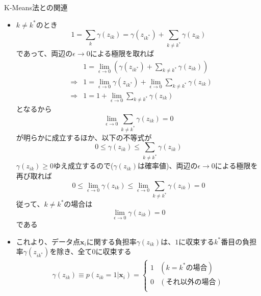 \documentclass[dvipdfmx,notheorems,t]{beamer}
\begin{document}
\begin{frame}{K-Means法との関連}
\begin{itemize}
\begin{itemize}
		\item $k \neq k^*$のとき
		\begin{equation}
			1 = \sum_k \gamma(z_{ik}) = \gamma(z_{ik^*}) + \sum_{k \neq k^*} \gamma(z_{ik})
		\end{equation}
		であって、両辺の$\epsilon \to 0$による極限を取れば
		\begin{eqnarray}
			&& 1 = \lim_{\epsilon \to 0} \left( \gamma(z_{ik^*}) + \sum_{k \neq k^*} \gamma(z_{ik}) \right) \nonumber \\
			&\Rightarrow& 1 = \lim_{\epsilon \to 0} \gamma(z_{ik^*}) + \lim_{\epsilon \to 0} \sum_{k \neq k^*} \gamma(z_{ik}) \nonumber \\
			&\Rightarrow& 1 = 1 + \lim_{\epsilon \to 0} \sum_{k \neq k^*} \gamma(z_{ik})
		\end{eqnarray}
		となるから
		\begin{equation}
			\lim_{\epsilon \to 0} \sum_{k \neq k^*} \gamma(z_{ik}) = 0
		\end{equation}
		が明らかに成立するほか、以下の不等式が
		\begin{equation}
			0 \le \gamma(z_{ik}) \le \sum_{k \neq k^*} \gamma(z_{ik})
		\end{equation}
		$\gamma(z_{ik}) \ge 0$ゆえ成立するので($\gamma(z_{ik})$は確率値)、両辺の$\epsilon \to 0$による極限を再び取れば
		\begin{equation}
			0 \le \lim_{\epsilon \to 0} \gamma(z_{ik}) \le \lim_{\epsilon \to 0} \sum_{k \neq k^*} \gamma(z_{ik}) = 0
		\end{equation}
		従って、$k \neq k^*$の場合は
		\begin{equation}
			\lim_{\epsilon \to 0} \gamma(z_{ik}) = 0
		\end{equation}
		である
		
		\item これより、データ点$\bm{x}_i$に関する負担率$\gamma(z_{ik})$は、$1$に収束する$k^*$番目の負担率$\gamma(z_{ik^*})$を除き、全て$0$に収束する
		\begin{eqnarray}
			\gamma(z_{ik}) \equiv p(z_{ik} = 1 | \bm{x}_i) = \left\{ \begin{array}{ll}
				1 & (k = k^* \text{の場合}) \\
				0 & (\text{それ以外の場合}) \\
				\end{array} \right.
		\end{eqnarray}
		

\end{itemize}
\end{itemize}
\end{frame}
\end{document}
